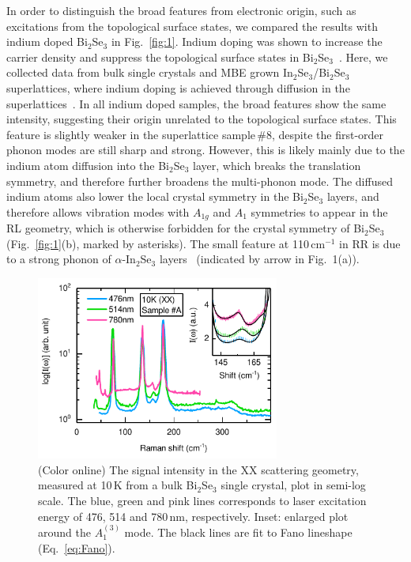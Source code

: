 \documentclass[reprint,aps,pra,superscriptaddress,amsmath,amssymb,linenumbers,longbibliography]{revtex4-1}
\begin{document}
In order to distinguish the broad features from electronic origin, such as excitations from the topological surface states, we compared the results with indium doped Bi$_2$Se$_3$ in Fig.~\ref{fig:1}.
Indium doping was shown to increase the carrier density and suppress the topological surface states in Bi$_2$Se$_3$~\cite{Brahlek2012,Wu2013}.
Here, we collected data from bulk single crystals and MBE grown In$_2$Se$_3$/Bi$_2$Se$_3$ superlattices, where indium doping is achieved through diffusion in the superlattices~\cite{Lee2014}.
In all indium doped samples, the broad features show the same intensity, suggesting their origin unrelated to the topological surface states.
This feature is slightly weaker in the superlattice sample\,\#8, despite the first-order phonon modes are still sharp and strong.
However, this is likely mainly due to the indium atom diffusion into the Bi$_2$Se$_3$ layer, which breaks the translation symmetry, and therefore further broadens the multi-phonon mode.
The diffused indium atoms also lower the local crystal symmetry in the Bi$_2$Se$_3$ layers, and therefore allows vibration modes with $A_{1g}$ and $A_1$ symmetries to appear in the RL geometry, which is otherwise forbidden for the crystal symmetry of Bi$_2$Se$_3$ (Fig.~\ref{fig:1}(b), marked by asterisks).
The small feature at 110\,cm$^{-1}$ in RR is due to a strong phonon of $\alpha$-In$_2$Se$_3$ layers~\cite{Lewandowska2001} (indicated by arrow in Fig.~1(a)).
%
\begin{figure}[t]
	\includegraphics[width=8cm]{Fig2.pdf}
	\caption{\label{fig:2}(Color online)
		The signal intensity in the XX scattering geometry, measured at 10\,K from a bulk Bi$_2$Se$_3$ single crystal, plot in semi-log scale.
		The blue, green and pink lines corresponds to laser excitation energy of 476, 514 and 780\,nm, respectively.
		Inset: enlarged plot around the $A_1^{(3)}$ mode. The black lines are fit to Fano lineshape (Eq.~\ref{eq:Fano}).
	}
\end{figure}
\end{document}
